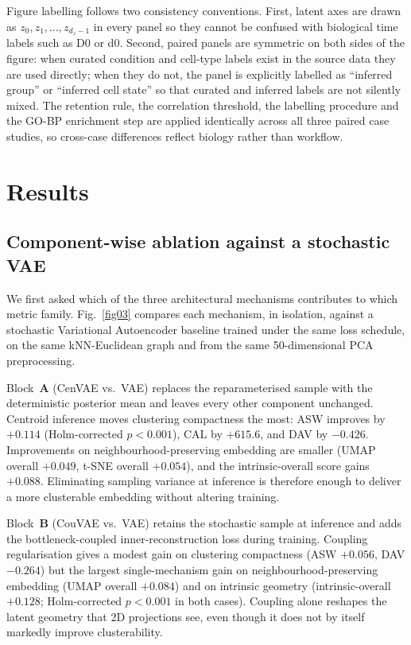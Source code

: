 \documentclass[referee, pdflatex, sn-vancouver-num]{sn-jnl}
\begin{document}
Figure labelling follows two consistency conventions. First, latent axes are drawn as $z_0,z_1,\ldots,z_{d_z-1}$ in every panel so they cannot be confused with biological time labels such as D0 or d0. Second, paired panels are symmetric on both sides of the figure: when curated condition and cell-type labels exist in the source data they are used directly; when they do not, the panel is explicitly labelled as ``inferred group'' or ``inferred cell state'' so that curated and inferred labels are not silently mixed. The retention rule, the correlation threshold, the labelling procedure and the GO-BP enrichment step are applied identically across all three paired case studies, so cross-case differences reflect biology rather than workflow.

\section{Results}

\subsection{Component-wise ablation against a stochastic VAE}\label{sec:ablation}

We first asked which of the three architectural mechanisms contributes to which metric family. Fig.~\ref{fig03} compares each mechanism, in isolation, against a stochastic Variational Autoencoder baseline trained under the same loss schedule, on the same kNN-Euclidean graph and from the same 50-dimensional PCA preprocessing.

Block~\textbf{A} (CenVAE vs.\ VAE) replaces the reparameterised sample with the deterministic posterior mean and leaves every other component unchanged. Centroid inference moves clustering compactness the most: ASW improves by $+0.114$ (Holm-corrected $p<0.001$), CAL by $+615.6$, and DAV by $-0.426$. Improvements on neighbourhood-preserving embedding are smaller (UMAP overall $+0.049$, t-SNE overall $+0.054$), and the intrinsic-overall score gains $+0.088$. Eliminating sampling variance at inference is therefore enough to deliver a more clusterable embedding without altering training.

Block~\textbf{B} (CouVAE vs.\ VAE) retains the stochastic sample at inference and adds the bottleneck-coupled inner-reconstruction loss during training. Coupling regularisation gives a modest gain on clustering compactness (ASW $+0.056$, DAV $-0.264$) but the largest single-mechanism gain on neighbourhood-preserving embedding (UMAP overall $+0.084$) and on intrinsic geometry (intrinsic-overall $+0.128$; Holm-corrected $p<0.001$ in both cases). Coupling alone reshapes the latent geometry that 2D projections see, even though it does not by itself markedly improve clusterability.
\end{document}
